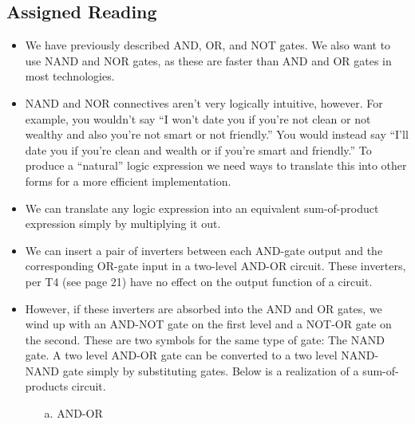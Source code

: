 \documentclass[10pt,a4paper]{article}
\begin{document}
\subsection{Assigned Reading}
\begin{itemize}
\item We have previously described AND, OR, and NOT gates. We also want to use NAND and NOR gates, as these are faster than AND and OR gates in most technologies. 
\pagebreak
\item NAND and NOR connectives aren't very logically intuitive, however. For example, you wouldn't say ``I won't date you if you're not clean or not wealthy and also you're not smart or not friendly.'' You would instead say ``I'll date you if you're clean and wealth or if you're smart and friendly.'' To produce a ``natural'' logic expression we need ways to translate this into other forms for a more efficient implementation. 
\item We can translate any logic expression into an equivalent sum-of-product expression simply by multiplying it out. 
\item We can insert a pair of inverters between each AND-gate output and the corresponding OR-gate input in a two-level AND-OR circuit. These inverters, per T4 (see page 21) have no effect on the output function of a circuit. 
\item However, if these inverters are absorbed into the AND and OR gates, we wind up with an AND-NOT gate on the first level and a NOT-OR gate on the second. These are two symbols for the same type of gate: The NAND gate. A two level AND-OR gate can be converted to a two level NAND-NAND gate simply by substituting gates. Below is a realization of a sum-of-products circuit.
\begin{enumerate}
\item [a.] AND-OR\\
\end{enumerate}
\end{itemize}
\end{document}
